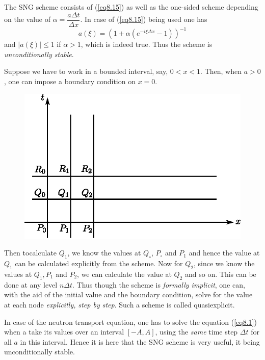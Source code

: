 \begin{exam}
The SNG scheme consists of (\ref{eq8.15}) as well as the one-sided scheme depending on the value of $\alpha = \dfrac{a\Delta t}{\Delta x}$. In case of (\ref{eq8.15}) being used one has
\begin{equation*}
a (\xi) = (1+ \alpha (e^{-i\xi \Delta x} -1))^{-1}\tag{8.16}\label{eq8.16}
\end{equation*}
and $|a(\xi)| \leq 1$ if $\alpha >1$, which is indeed true. Thus the scheme is {\em unconditionally stable}.

Suppose we have to work in a bounded interval, say, $0 < x< 1$. Then, when $a>0$, one can impose a boundary condition on $x=0$. 

\begin{figure}[H]
\centering
\includegraphics{figures/fig52-8.4.eps}
\caption{}\label{c8:fig8.4}
\end{figure}

Then to\pageoriginale calculate $Q_1$, we know the values at $Q_\circ$, $P_\circ$ and $P_1$ and hence the value at $Q_1$ can be calculated explicitly from the scheme. Now for $Q_2$, since we know the values at $Q_1 , P_1$ and $P_2$, we can calculate the value at $Q_2$ and so on. This can be done at any level $n \Delta t$. Thus though the scheme is {\em formally implicit}, one can, with the aid of the initial value and the boundary condition, solve for the value at each node {\em explicitly, step by step}. Such a scheme is called quasiexplicit. 
\end{exam}

\begin{remark}\label{chap8:rem8.3}
In case of the neutron transport equation, one has to solve the
equation (\ref{eq8.1}) when a take its values over an interval
$[-A,A]$, using the {\em same } time step $\Delta t$  for all $a$ in
this interval. Hence it is here that the SNG scheme is very useful, it
being unconditionally stable. 
\end{remark}

